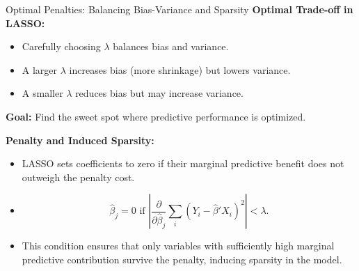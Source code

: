 \documentclass[xcolor=svgnames,t]{beamer}
\begin{document}
    
    \begin{frame}{Optimal Penalties: Balancing Bias-Variance and Sparsity}
        \textbf{Optimal Trade-off in LASSO:}
        \begin{itemize}
            \item Carefully choosing \(\lambda\) balances bias and variance.
            \pause
            \item A larger \(\lambda\) increases bias (more shrinkage) but lowers variance.
            \pause
            \item A smaller \(\lambda\) reduces bias but may increase variance.
            \pause
        \end{itemize}
        
        \textbf{Goal:} Find the sweet spot where predictive performance is optimized.
        
        \pause
        
        \textbf{Penalty and Induced Sparsity:}
        \begin{itemize}
            \item LASSO sets coefficients to zero if their marginal predictive benefit does not outweigh the penalty cost.
            \pause
            \item 
            \[
            \widehat{\beta}_j = 0 \text{ if } 
            \left|\frac{\partial}{\partial \widehat{\beta}_j}\sum_{i}(Y_i-\widehat{\beta}'X_i)^2\right| < \lambda.
            \]
            \pause
            \item This condition ensures that only variables with sufficiently high marginal predictive contribution survive the penalty, inducing sparsity in the model.
        \end{itemize}
        \end{frame}
        
\end{document}
